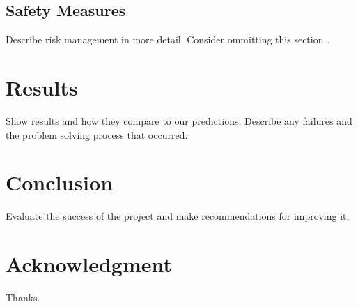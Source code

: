 \documentclass[journal]{IEEEtran}
\begin{document}
\subsection{Safety Measures}
Describe risk management in more detail. Consider ommitting this section \cite{linden}.

\section{Results}
Show results and how they compare to our predictions. Describe any failures and the problem solving process that occurred.

\section{Conclusion}
Evaluate the success of the project and make recommendations for improving it.

\section*{Acknowledgment}
Thanks.



\end{document}

